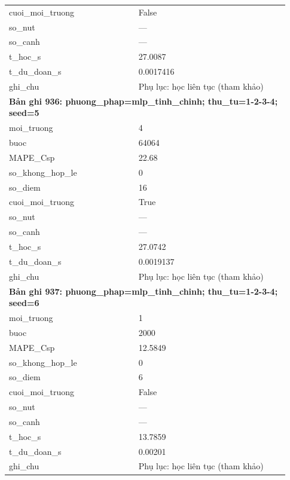 \begin{longtable}{p{0.43\linewidth}p{0.50\linewidth}}
cuoi\_\allowbreak moi\_\allowbreak truong & False \\
so\_\allowbreak nut & — \\
so\_\allowbreak canh & — \\
t\_\allowbreak hoc\_\allowbreak s & 27.0087 \\
t\_\allowbreak du\_\allowbreak doan\_\allowbreak s & 0.0017416 \\
ghi\_\allowbreak chu & Phụ lục: học liên tục (tham khảo) \\
\midrule
\multicolumn{2}{p{0.95\linewidth}}{\textbf{Bản ghi 936: phuong\_phap=mlp\_tinh\_chinh; thu\_tu=1-2-3-4; seed=5}} \\
moi\_\allowbreak truong & 4 \\
buoc & 64064 \\
MAPE\_\allowbreak Csp & 22.68 \\
so\_\allowbreak khong\_\allowbreak hop\_\allowbreak le & 0 \\
so\_\allowbreak diem & 16 \\
cuoi\_\allowbreak moi\_\allowbreak truong & True \\
so\_\allowbreak nut & — \\
so\_\allowbreak canh & — \\
t\_\allowbreak hoc\_\allowbreak s & 27.0742 \\
t\_\allowbreak du\_\allowbreak doan\_\allowbreak s & 0.0019137 \\
ghi\_\allowbreak chu & Phụ lục: học liên tục (tham khảo) \\
\midrule
\multicolumn{2}{p{0.95\linewidth}}{\textbf{Bản ghi 937: phuong\_phap=mlp\_tinh\_chinh; thu\_tu=1-2-3-4; seed=6}} \\
moi\_\allowbreak truong & 1 \\
buoc & 2000 \\
MAPE\_\allowbreak Csp & 12.5849 \\
so\_\allowbreak khong\_\allowbreak hop\_\allowbreak le & 0 \\
so\_\allowbreak diem & 6 \\
cuoi\_\allowbreak moi\_\allowbreak truong & False \\
so\_\allowbreak nut & — \\
so\_\allowbreak canh & — \\
t\_\allowbreak hoc\_\allowbreak s & 13.7859 \\
t\_\allowbreak du\_\allowbreak doan\_\allowbreak s & 0.00201 \\
ghi\_\allowbreak chu & Phụ lục: học liên tục (tham khảo) \\

\end{longtable}
